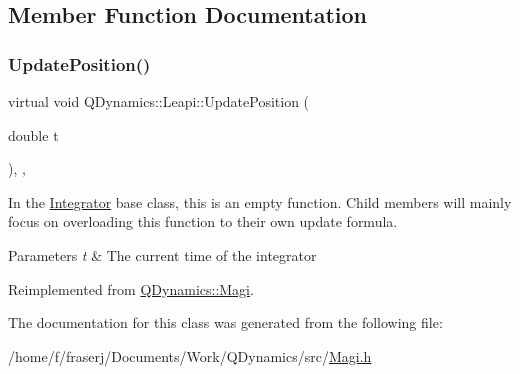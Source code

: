 \subsection{Member Function Documentation}
\mbox{\label{classQDynamics_1_1Leapi_ada2b4935513fa7e0cb4f78ade9f2fd0e}} 
\subsubsection{\texorpdfstring{Update\+Position()}{UpdatePosition()}}
{\footnotesize\ttfamily virtual void Q\+Dynamics\+::\+Leapi\+::\+Update\+Position (\begin{DoxyParamCaption}\item[{double}]{t }\end{DoxyParamCaption})\hspace{0.3cm}{\ttfamily [inline]}, {\ttfamily [private]}, {\ttfamily [virtual]}}



In the \hyperlink{classQDynamics_1_1Integrator}{Integrator} base class, this is an empty function. Child members will mainly focus on overloading this function to their own update formula. 


\begin{DoxyParams}{Parameters}
{\em t} & The current time of the integrator \\
\hline
\end{DoxyParams}


Reimplemented from \hyperlink{classQDynamics_1_1Magi_a500467f899244edfae15f34c84c7684c}{Q\+Dynamics\+::\+Magi}.



The documentation for this class was generated from the following file\+:\begin{DoxyCompactItemize}
\item 
/home/f/fraserj/\+Documents/\+Work/\+Q\+Dynamics/src/\hyperlink{Magi_8h}{Magi.\+h}\end{DoxyCompactItemize}
